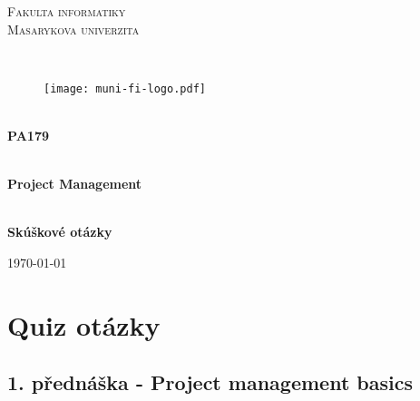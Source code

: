 \documentclass[11pt,a4paper]{article}
\begin{document}

\begin{titlepage}

    \begin{center}
        \vfill {%
            \Huge{%
                \textsc{%
                    Fakulta informatiky\\[3mm]%
                    Masarykova univerzita%
                }%
            }%
        }%

        \hfill\\[15mm]

        \begin{figure}[!h]
            \centering
            \texttt{[image: muni-fi-logo.pdf]}
        \end{figure}

        \hfill\\[10mm]

        \Huge{
            \textbf{
                PA179
            }
        }

        \hfill\\[-10mm]

        \huge{
            \textbf{
                Project Management
            }
        }

        \hfill\\[10mm]

        \LARGE{
            \textbf{
                Skúškové otázky
            }
        }
        \vfill

        \Large{
            \today
        }

    \end{center}
\end{titlepage}

\setlength{\parskip}{0pt}
    \hypersetup{hidelinks}\tableofcontents
\setlength{\parskip}{0pt}

\newpage


\section{Quiz otázky}


    \subsection{1. přednáška - Project management basics \cite{prvni}}
\end{document}
